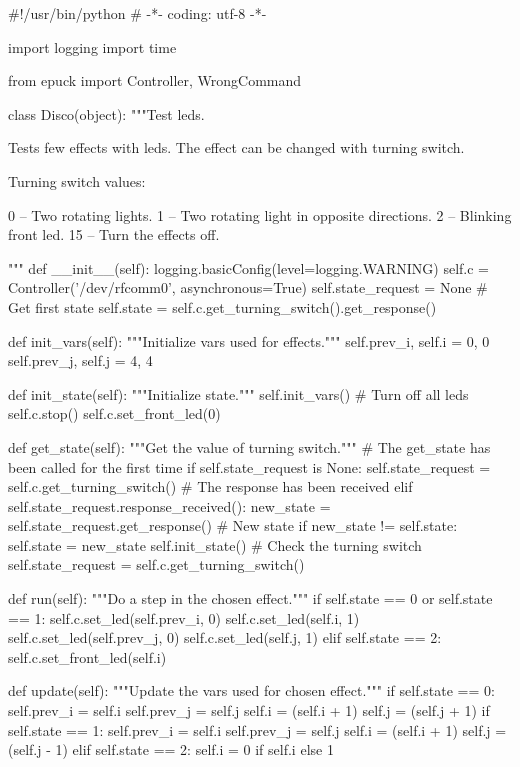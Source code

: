 \documentclass[12pt,notitlepage]{report}
\newenvironment{mylisting}{}{}
\begin{document}
\begin{mylisting}
\begin{pyc}
#!/usr/bin/python
# -*- coding: utf-8 -*-

import logging
import time

from epuck import Controller, WrongCommand

class Disco(object):
    """Test leds.

    Tests few effects with leds. 
    The effect can be changed with turning switch.

    Turning switch values:

        0 -- Two rotating lights.
        1 -- Two rotating light in opposite directions.
        2 -- Blinking front led.
        15 -- Turn the effects off.

    """
    def __init__(self):
        logging.basicConfig(level=logging.WARNING)
        self.c = Controller('/dev/rfcomm0', asynchronous=True)
        self.state_request = None
        # Get first state
        self.state = self.c.get_turning_switch().get_response()

    def init_vars(self):
        """Initialize vars used for effects."""
        self.prev_i, self.i = 0, 0
        self.prev_j, self.j = 4, 4

    def init_state(self):
        """Initialize state."""
        self.init_vars()
        # Turn off all leds
        self.c.stop()
        self.c.set_front_led(0)

    def get_state(self):
        """Get the value of turning switch."""
        # The get_state has been called for the first time
        if self.state_request is None:
            self.state_request = self.c.get_turning_switch()
        # The response has been received
        elif self.state_request.response_received():
            new_state = self.state_request.get_response()
            # New state
            if new_state != self.state:
                self.state = new_state
                self.init_state()
            # Check the turning switch
            self.state_request = self.c.get_turning_switch()

    def run(self):
        """Do a step in the chosen effect."""
        if self.state == 0 or self.state == 1:
            self.c.set_led(self.prev_i, 0)
            self.c.set_led(self.i, 1)
            self.c.set_led(self.prev_j, 0)
            self.c.set_led(self.j, 1)
        elif self.state == 2:
            self.c.set_front_led(self.i)

    def update(self):
        """Update the vars used for chosen effect."""
        if self.state == 0:
            self.prev_i = self.i
            self.prev_j = self.j
            self.i = (self.i + 1) %
            self.j = (self.j + 1) %
        if self.state == 1:
            self.prev_i = self.i
            self.prev_j = self.j
            self.i = (self.i + 1) %
            self.j = (self.j - 1) %
        elif self.state == 2:
            self.i = 0 if self.i else 1


\end{pyc}
\end{mylisting}
\end{document}
